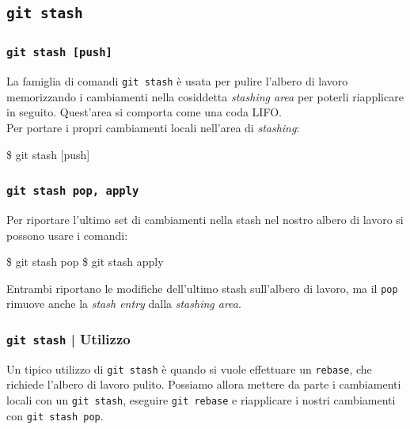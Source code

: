 \documentclass{beamer}
\begin{document}

\subsection{\texttt{git stash}}
\begin{frame}
  \frametitle{\texttt{git stash [push]}}
  La famiglia di comandi \texttt{git stash} \`e usata per pulire l'albero di
  lavoro memorizzando i cambiamenti nella cosiddetta \emph{stashing area} per
  poterli riapplicare in seguito. Quest'area si comporta come una coda LIFO. \\
  Per portare i propri cambiamenti locali nell'area di \emph{stashing}:
  \begin{semiverbatim}
  \$ git stash [push]
  \end{semiverbatim}
\end{frame}

\begin{frame}
  \frametitle{\texttt{git stash pop, apply}}
  Per riportare l'ultimo set di cambiamenti nella stash nel nostro albero di
  lavoro si possono usare i comandi:
  \begin{semiverbatim}
  \$ git stash pop  \$ git stash apply
  \end{semiverbatim}
  Entrambi riportano le modifiche dell'ultimo stash sull'albero di lavoro, ma il
  \texttt{pop} rimuove anche la \emph{stash entry} dalla \emph{stashing area}.
\end{frame}

\begin{frame}
  \frametitle{\texttt{git stash} | Utilizzo}
  Un tipico utilizzo di \texttt{git stash} \`e quando si vuole effettuare un
  \texttt{rebase}, che richiede l'albero di lavoro pulito. Possiamo allora
  mettere da parte i cambiamenti locali con un \texttt{git stash}, eseguire
  \texttt{git rebase} e riapplicare i nostri cambiamenti con \texttt{git stash pop}.
\end{frame}
\end{document}
